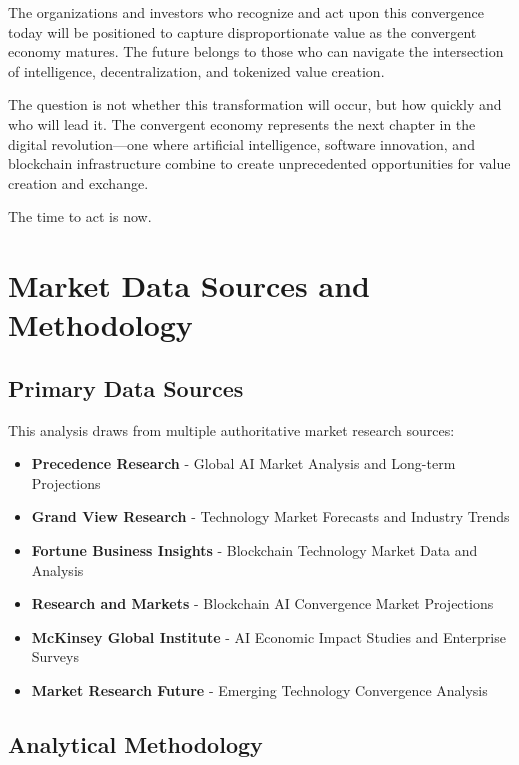\documentclass[11pt,a4paper]{report}
\begin{document}
The organizations and investors who recognize and act upon this convergence today will be positioned to capture disproportionate value as the convergent economy matures. The future belongs to those who can navigate the intersection of intelligence, decentralization, and tokenized value creation.

The question is not whether this transformation will occur, but how quickly and who will lead it. The convergent economy represents the next chapter in the digital revolution---one where artificial intelligence, software innovation, and blockchain infrastructure combine to create unprecedented opportunities for value creation and exchange.

The time to act is now.

\appendix
\chapter{Market Data Sources and Methodology}

\section{Primary Data Sources}
This analysis draws from multiple authoritative market research sources:

\begin{itemize}
    \item \textbf{Precedence Research} - Global AI Market Analysis and Long-term Projections
    \item \textbf{Grand View Research} - Technology Market Forecasts and Industry Trends
    \item \textbf{Fortune Business Insights} - Blockchain Technology Market Data and Analysis
    \item \textbf{Research and Markets} - Blockchain AI Convergence Market Projections
    \item \textbf{McKinsey Global Institute} - AI Economic Impact Studies and Enterprise Surveys
    \item \textbf{Market Research Future} - Emerging Technology Convergence Analysis
\end{itemize}

\section{Analytical Methodology}
\end{document}
